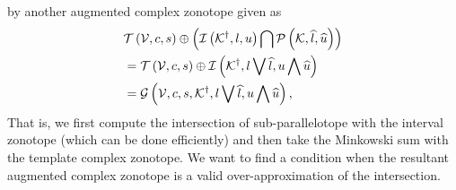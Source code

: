 %
by another augmented complex zonotope given as
%
\begin{align*}
& \mathit{\operatorname{\mathcal{T}}}\left(\mathcal{V},c,s\right)\oplus \left(\mathit{\operatorname{\mathcal{I}}}\left({\mathcal{K}}^\dagger,l,u\right)\bigcap \mathcal{P}\left(\mathcal{K},\widehat{l},\widehat{u}\right)\right)\\
& =
  \mathit{\operatorname{\mathcal{T}}}\left(\mathcal{V},c,s\right)\oplus \mathit{\operatorname{\mathcal{I}}}\left({\mathcal{K}}^\dagger,l\bigvee \widehat{l},u\bigwedge \widehat{u}\right)\\
& = \mathcal{G}\left(\mathcal{V},c,s,{\mathcal{K}}^\dagger,l\bigvee \widehat{l},u\bigwedge \widehat{u}\right),
\end{align*}
%
That is, we first compute the intersection of
sub-parallelotope with the interval zonotope (which can be done
efficiently) and then take the Minkowski sum with the template complex
zonotope.  We want to find a condition when the resultant augmented
complex zonotope is a valid over-approximation of the intersection.

